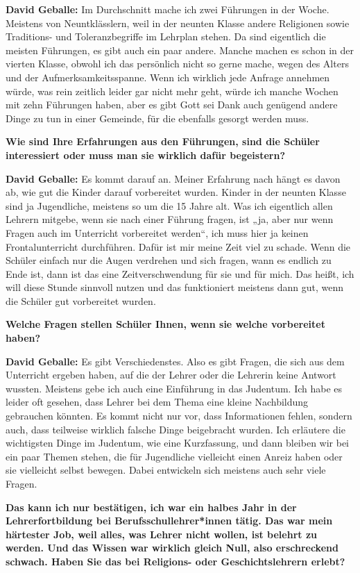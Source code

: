 \textbf{David Geballe:} Im Durchschnitt mache ich zwei Führungen in der Woche. Meistens von Neuntklässlern, weil in der neunten Klasse andere Religionen sowie Traditions- und Toleranzbegriffe im Lehrplan stehen. Da sind eigentlich die meisten Führungen, es gibt auch ein paar andere. Manche machen es schon in der vierten Klasse, obwohl ich das persönlich nicht so gerne mache, wegen des Alters und der Aufmerksamkeitsspanne. Wenn ich wirklich jede Anfrage annehmen würde, was rein zeitlich leider gar nicht mehr geht, würde ich manche Wochen mit zehn Führungen haben, aber es gibt Gott sei Dank auch genügend andere Dinge zu tun in einer Gemeinde, für die ebenfalls gesorgt werden muss. 

\textbf{Wie sind Ihre Erfahrungen aus den Führungen, sind die Schüler interessiert oder muss man sie wirklich dafür begeistern?} 

\textbf{David Geballe:} Es kommt darauf an. Meiner Erfahrung nach hängt es davon ab, wie gut die Kinder darauf vorbereitet wurden. Kinder in der neunten Klasse sind ja Jugendliche, meistens so um die 15 Jahre alt. Was ich eigentlich allen Lehrern mitgebe, wenn sie nach einer Führung fragen, ist „ja, aber nur wenn Fragen auch im Unterricht vorbereitet werden“, ich muss hier ja keinen Frontalunterricht durchführen. Dafür ist mir meine Zeit viel zu schade. Wenn die Schüler einfach nur die Augen verdrehen und sich fragen, wann es endlich zu Ende ist, dann ist das eine Zeitverschwendung für sie und für mich. Das heißt, ich will diese Stunde sinnvoll nutzen und das funktioniert meistens dann gut, wenn die Schüler gut vorbereitet wurden. 

\textbf{Welche Fragen stellen Schüler Ihnen, wenn sie welche vorbereitet haben?} 

\textbf{David Geballe:} Es gibt Verschiedenstes. Also es gibt Fragen, die sich aus dem Unterricht ergeben haben, auf die der Lehrer oder die Lehrerin keine Antwort wussten. Meistens gebe ich auch eine Einführung in das Judentum. Ich habe es leider oft gesehen, dass Lehrer bei dem Thema eine kleine Nachbildung gebrauchen könnten. Es kommt nicht nur vor, dass Informationen fehlen, sondern auch, dass teilweise wirklich falsche Dinge beigebracht wurden. Ich erläutere die wichtigsten Dinge im Judentum, wie eine Kurzfassung, und dann bleiben wir bei ein paar Themen stehen, die für Jugendliche vielleicht einen Anreiz haben oder sie vielleicht selbst bewegen. Dabei entwickeln sich meistens auch sehr viele Fragen. 

\textbf{Das kann ich nur bestätigen, ich war ein halbes Jahr in der Lehrerfortbildung bei Berufsschullehrer*innen tätig. Das war mein härtester Job, weil alles, was Lehrer nicht wollen, ist belehrt zu werden. Und das Wissen war wirklich gleich Null, also erschreckend schwach. Haben Sie das bei Religions- oder Geschichtslehrern erlebt?} 

